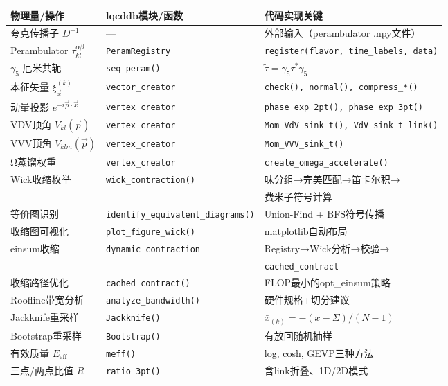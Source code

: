 \documentclass[11pt,a4paper]{ctexart}
\begin{document}
\begin{table}[h]
\centering
\begin{tabular}{@{}p{5cm}p{3cm}p{6cm}@{}}
\toprule
物理量/操作 & lqcddb模块/函数 & 代码实现关键 \\
\midrule
夸克传播子 $D^{-1}$ & — & 外部输入（perambulator .npy文件） \\
Perambulator $\tau_{kl}^{\alpha\beta}$ & \texttt{PeramRegistry} & \texttt{register(flavor, time\_labels, data)} \\
$\gamma_5$-厄米共轭 & \texttt{seq\_peram()} & $\tilde{\tau} = \gamma_5 \tau^* \gamma_5$ \\
本征矢量 $\xi^{(k)}_{\vec{x}}$ & \texttt{vector\_creator} & \texttt{check(), normal(), compress\_*()} \\
动量投影 $e^{-i\vec{p}\cdot\vec{x}}$ & \texttt{vertex\_creator} & \texttt{phase\_exp\_2pt(), phase\_exp\_3pt()} \\
VDV顶角 $V_{kl}(\vec{p})$ & \texttt{vertex\_creator} & \texttt{Mom\_VdV\_sink\_t(), VdV\_sink\_t\_link()} \\
VVV顶角 $V_{klm}(\vec{p})$ & \texttt{vertex\_creator} & \texttt{Mom\_VVV\_sink\_t()} \\
Ω蒸馏权重 & \texttt{vertex\_creator} & \texttt{create\_omega\_accelerate()} \\
Wick收缩枚举 & \texttt{wick\_contraction()} & 味分组→完美匹配→笛卡尔积→\\
&& 费米子符号计算 \\
等价图识别 & \texttt{identify\_equivalent\_diagrams()} & Union-Find + BFS符号传播 \\
收缩图可视化 & \texttt{plot\_figure\_wick()} & matplotlib自动布局 \\
einsum收缩 & \texttt{dynamic\_contraction} & Registry→Wick分析→校验→\\
&& \texttt{cached\_contract} \\
收缩路径优化 & \texttt{cached\_contract()} & FLOP最小的opt\_einsum策略 \\
Roofline带宽分析 & \texttt{analyze\_bandwidth()} & 硬件规格+切分建议 \\
Jackknife重采样 & \texttt{Jackknife()} & $\bar{x}_{(k)} = -(x - \Sigma)/(N-1)$ \\
Bootstrap重采样 & \texttt{Bootstrap()} & 有放回随机抽样 \\
有效质量 $E_{\mathrm{eff}}$ & \texttt{meff()} & log, cosh, GEVP三种方法 \\
三点/两点比值 $R$ & \texttt{ratio\_3pt()} & 含link折叠、1D/2D模式 \\

\end{tabular}
\end{table}
\end{document}
